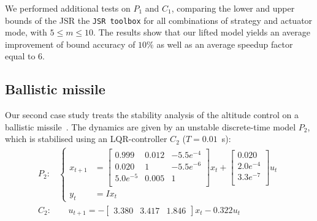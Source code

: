 We performed additional tests on $P_1$ and $C_1$, comparing the lower and upper bounds of the JSR 
 the \texttt{JSR toolbox} for all combinations of strategy and actuator mode, with $5 \leq m \leq 10$.
The results show that our lifted model yields an average improvement of bound accuracy of $10 \%$ as well as an average speedup factor equal to $6$.

\subsection{Ballistic missile}\label{sec:eval:unstable}
Our second case study treats the stability analysis of the altitude control on a ballistic missile~\cite{Blakelock:1991, Sree:2006}.
The dynamics are given by an unstable discrete-time model $P_2$, which is stabilised using an LQR-controller $C_2$ ($T = 0.01$~s):
\begin{equation*}%
    {
    \begin{aligned}
        P_2: &
        \begin{cases}
            x_{t+1} &= \begin{bmatrix}
                0.999 & 0.012 & -5.5 e^{-4} \\
                0.020 & 1 & -5.5 e^{-6} \\
                5.0 e^{-5} & 0.005 & 1 \\
            \end{bmatrix} x_t + \begin{bmatrix}
                0.020 \\
                2.0e^{-4} \\
                3.3e^{-7} \\
            \end{bmatrix}u_t \\
            y_t &= I x_t
        \end{cases} \\
        C_2: & \quad\, u_{t+1} = -\begin{bmatrix}
            3.380 & 3.417 & 1.846
        \end{bmatrix} x_t - 0.322 u_t
    \end{aligned}
    }
\end{equation*}

